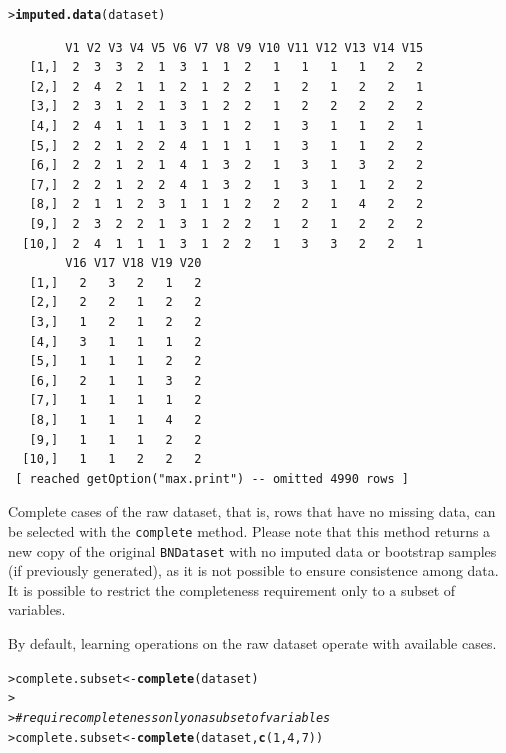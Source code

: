 \documentclass{article}\usepackage[]{graphicx}\usepackage[]{color}
\makeatletter
\newcommand{\hlnum}[1]{\textcolor[rgb]{0.686,0.059,0.569}{#1}}%
\newcommand{\hlcom}[1]{\textcolor[rgb]{0.678,0.584,0.686}{\textit{#1}}}%
\newcommand{\hlstd}[1]{\textcolor[rgb]{0.345,0.345,0.345}{#1}}%
\newcommand{\hlkwb}[1]{\textcolor[rgb]{0.69,0.353,0.396}{#1}}%
\newcommand{\hlkwd}[1]{\textcolor[rgb]{0.737,0.353,0.396}{\textbf{#1}}}%
\newenvironment{kframe}{%
 \def\at@end@of@kframe{}%
 \ifinner\ifhmode%
  \def\at@end@of@kframe{\end{minipage}}%
  \begin{minipage}{\columnwidth}%
 \fi\fi%
 \def\FrameCommand##1{\hskip\@totalleftmargin \hskip-\fboxsep
 \colorbox{shadecolor}{##1}\hskip-\fboxsep
     \hskip-\linewidth \hskip-\@totalleftmargin \hskip\columnwidth}%
 \MakeFramed {\advance\hsize-\width
   \@totalleftmargin\z@ \linewidth\hsize
   \@setminipage}}%
 {\par\unskip\endMakeFramed%
 \at@end@of@kframe}
\newenvironment{knitrout}{}{} %
\newcommand{\Robject}[1]{{\texttt{#1}}}
\newcommand{\Rmethod}[1]{{\texttt{#1}}}
\makeatother
\begin{document}
\begin{knitrout}
\begin{kframe}
{\ttfamily\noindent\itshape\color{messagecolor}{bnstruct :: performing imputation ...\\bnstruct :: imputation finished.}}\begin{alltt}
\hlstd{> }\hlkwd{imputed.data}\hlstd{(dataset)}
\end{alltt}
\begin{verbatim}
        V1 V2 V3 V4 V5 V6 V7 V8 V9 V10 V11 V12 V13 V14 V15
   [1,]  2  3  3  2  1  3  1  1  2   1   1   1   1   2   2
   [2,]  2  4  2  1  1  2  1  2  2   1   2   1   2   2   1
   [3,]  2  3  1  2  1  3  1  2  2   1   2   2   2   2   2
   [4,]  2  4  1  1  1  3  1  1  2   1   3   1   1   2   1
   [5,]  2  2  1  2  2  4  1  1  1   1   3   1   1   2   2
   [6,]  2  2  1  2  1  4  1  3  2   1   3   1   3   2   2
   [7,]  2  2  1  2  2  4  1  3  2   1   3   1   1   2   2
   [8,]  2  1  1  2  3  1  1  1  2   2   2   1   4   2   2
   [9,]  2  3  2  2  1  3  1  2  2   1   2   1   2   2   2
  [10,]  2  4  1  1  1  3  1  2  2   1   3   3   2   2   1
        V16 V17 V18 V19 V20
   [1,]   2   3   2   1   2
   [2,]   2   2   1   2   2
   [3,]   1   2   1   2   2
   [4,]   3   1   1   1   2
   [5,]   1   1   1   2   2
   [6,]   2   1   1   3   2
   [7,]   1   1   1   1   2
   [8,]   1   1   1   4   2
   [9,]   1   1   1   2   2
  [10,]   1   1   2   2   2
 [ reached getOption("max.print") -- omitted 4990 rows ]
\end{verbatim}
\end{kframe}
\end{knitrout}

Complete cases of the raw dataset, that is, rows that have no missing data, can be selected with the \Rmethod{complete} method. Please note that this method returns a new copy of the original
\Robject{BNDataset} with no imputed data or bootstrap samples (if previously generated), as it
is not possible to ensure consistence among data.
It is possible to restrict the completeness requirement only to a subset of variables.

By default, learning operations on the raw dataset operate with available cases.

\begin{knitrout}
\color{fgcolor}\begin{kframe}
\begin{alltt}
\hlstd{> }\hlstd{complete.subset} \hlkwb{<-} \hlkwd{complete}\hlstd{(dataset)}
\hlstd{> }
\hlstd{> }\hlcom{# require completeness only on a subset of variables}
\hlstd{> }\hlstd{complete.subset} \hlkwb{<-} \hlkwd{complete}\hlstd{(dataset,} \hlkwd{c}\hlstd{(}\hlnum{1}\hlstd{,}\hlnum{4}\hlstd{,}\hlnum{7}\hlstd{))}
\end{alltt}
\end{kframe}
\end{knitrout}
\end{document}
